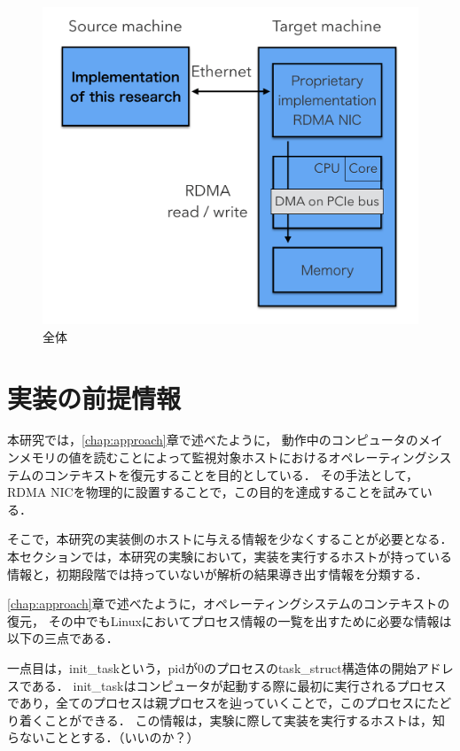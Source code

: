 \begin{figure}[htbp]
    \caption{全体}
    \label{fig:zentai}
    \begin{center}
        \includegraphics[bb=0 0 1000 800,width=15cm]{img/zentai.png}
    \end{center}
\end{figure}

\section{実装の前提情報}

本研究では，\ref{chap:approach}章で述べたように，
動作中のコンピュータのメインメモリの値を読むことによって監視対象ホストにおけるオペレーティングシステムのコンテキストを復元することを目的としている．
その手法として，RDMA NICを物理的に設置することで，この目的を達成することを試みている．

そこで，本研究の実装側のホストに与える情報を少なくすることが必要となる．
本セクションでは，本研究の実験において，実装を実行するホストが持っている情報と，初期段階では持っていないが解析の結果導き出す情報を分類する．

\ref{chap:approach}章で述べたように，オペレーティングシステムのコンテキストの復元，
その中でもLinuxにおいてプロセス情報の一覧を出すために必要な情報は以下の三点である．

一点目は，init_taskという，pidが0のプロセスのtask\_struct構造体の開始アドレスである．
init_taskはコンピュータが起動する際に最初に実行されるプロセスであり，全てのプロセスは親プロセスを辿っていくことで，このプロセスにたどり着くことができる．
この情報は，実験に際して実装を実行するホストは，知らないこととする．（いいのか？）

